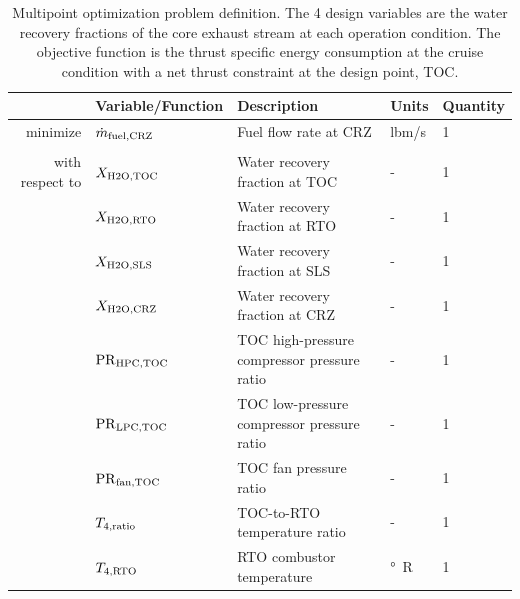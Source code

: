 \documentclass[conf]{new-aiaa}
\begin{document}
\begin{table}[hbt!]
    \centering
    \caption{
        Multipoint optimization problem definition.
        The 4 design variables are the water recovery fractions of the core exhaust stream at each operation condition.
        The objective function is the thrust specific energy consumption at the cruise condition with a net thrust constraint at the design point, TOC.
    }
    \small
    \renewcommand{\arraystretch}{1.2}
    \begin{tabular}{r l l l l}
        \toprule
                        & Variable/Function              & Description                                 & Units            & Quantity \\
        \hline
        minimize        & $ \dot{m}_{\rm{fuel,CRZ}} $    & Fuel flow rate at CRZ                       & \unit{lbm/s}     & 1        \\
                        &                                &                                             &                  &          \\
        with respect to & $X_{\rm{H2O,TOC}}$             & Water recovery fraction at TOC              & -                & 1        \\
                        & $X_{\rm{H2O,RTO}}$             & Water recovery fraction at RTO              & -                & 1        \\
                        & $X_{\rm{H2O,SLS}}$             & Water recovery fraction at SLS              & -                & 1        \\
                        & $X_{\rm{H2O,CRZ}}$             & Water recovery fraction at CRZ              & -                & 1        \\
                        & $\rm{PR}_{\rm{HPC,TOC}}$       & TOC high-pressure compressor pressure ratio & -                & 1        \\
                        & $\rm{PR}_{\rm{LPC,TOC}}$       & TOC low-pressure compressor pressure ratio  & -                & 1        \\
                        & $\rm{PR}_{\rm{fan,TOC}}$       & TOC fan pressure ratio                      & -                & 1        \\
                        & $T_{4,\rm{ratio}}$             & TOC-to-RTO temperature ratio                & -                & 1        \\
                        & $T_{4,\rm{RTO}}$               & RTO combustor temperature                   & \unit{\degree R} & 1        \\

\end{tabular}
\end{table}
\end{document}

